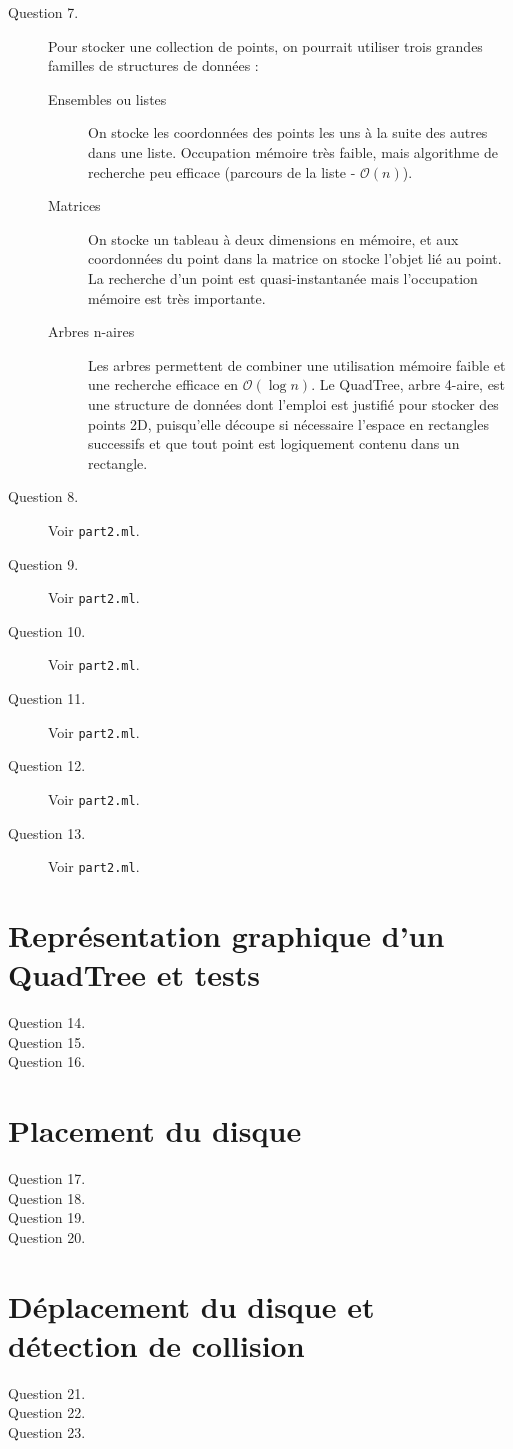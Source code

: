 \documentclass[11pt]{scrartcl}
\begin{document}
\begin{description}
\item[Question 7.] Pour stocker une collection de points, on pourrait utiliser trois grandes familles de structures de données :
\begin{description}
\item[Ensembles ou listes] On stocke les coordonnées des points les uns à la suite des autres dans une liste. Occupation mémoire très faible, mais algorithme de recherche peu efficace (parcours de la liste - $\mathcal{O}(n)$).
\item[Matrices] On stocke un tableau à deux dimensions en mémoire, et aux coordonnées du point dans la matrice on stocke l'objet lié au point. La recherche d'un point est quasi-instantanée mais l'occupation mémoire est très importante.
\item[Arbres n-aires] Les arbres permettent de combiner une utilisation mémoire faible et une recherche efficace en $\mathcal{O}(\log{}n)$. Le QuadTree, arbre 4-aire, est une structure de données dont l'emploi est justifié pour stocker des points 2D, puisqu'elle découpe si nécessaire l'espace en rectangles successifs et que tout point est logiquement contenu dans un rectangle.
\end{description}
\item[Question 8.] Voir \texttt{part2.ml}.
\item[Question 9.] Voir \texttt{part2.ml}.
\item[Question 10.] Voir \texttt{part2.ml}.
\item[Question 11.] Voir \texttt{part2.ml}.
\item[Question 12.] Voir \texttt{part2.ml}.
\item[Question 13.] Voir \texttt{part2.ml}.
\end{description}

\section{Représentation graphique d'un QuadTree et tests}

\begin{description}
\item[Question 14.]
\item[Question 15.]
\item[Question 16.]
\end{description}

\section{Placement du disque}

\begin{description}
\item[Question 17.]
\item[Question 18.]
\item[Question 19.]
\item[Question 20.]
\end{description}

\section{Déplacement du disque et détection de collision}

\begin{description}
\item[Question 21.]
\item[Question 22.]
\item[Question 23.]
\end{description}
\end{document}
